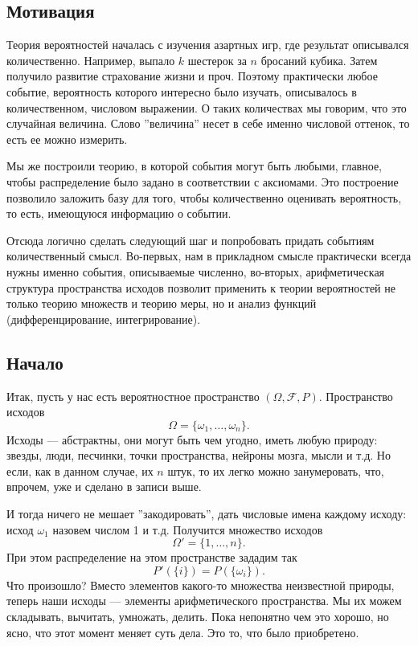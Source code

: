 \documentclass[a4paper,12pt]{article}
\newcounter{th-counter}
\begin{document}
\subsection*{Мотивация}
Теория вероятностей началась с изучения азартных игр, где результат описывался количественно. Например, выпало $k$ шестерок за $n$ бросаний кубика. Затем получило развитие страхование жизни и проч. Поэтому практически любое событие, вероятность которого интересно было изучать, описывалось в количественном, числовом выражении. О таких количествах мы говорим, что это случайная величина. Слово ''величина'' несет в себе именно числовой оттенок, то есть ее можно измерить.

Мы же построили теорию, в которой события могут быть любыми, главное, чтобы распределение было задано в соответствии с аксиомами. Это построение позволило заложить базу для того, чтобы количественно оценивать вероятность, то есть, имеющуюся информацию о событии.

Отсюда логично сделать следующий шаг и попробовать придать событиям количественный смысл. Во-первых, нам в прикладном смысле практически всегда нужны именно события, описываемые численно, во-вторых, арифметическая структура пространства исходов позволит применить к теории вероятностей не только теорию множеств и теорию меры, но и анализ функций (дифференцирование, интегрирование).

\subsection*{Начало}
Итак, пусть у нас есть вероятностное пространство $(\Omega, \mathcal{F}, P)$. Пространство исходов
\[
\Omega = \{\omega_1, \ldots, \omega_n\}.
\]
Исходы --- абстрактны, они могут быть чем угодно, иметь любую природу: звезды, люди, песчинки, точки пространства, нейроны мозга, мысли и т.д. Но если, как в данном случае, их $n$ штук, то их легко можно занумеровать, что, впрочем, уже и сделано в записи выше.

И тогда ничего не мешает ''закодировать'', дать числовые имена каждому исходу: исход $\omega_1$ назовем числом 1 и т.д. Получится множество исходов
\[
\Omega' = \{1, \ldots, n\}.
\]
При этом распределение на этом пространстве зададим так
\[
P'(\{i\}) = P(\{\omega_i\}).
\]
Что произошло? Вместо элементов какого-то множества неизвестной природы, теперь наши исходы --- элементы арифметического пространства. Мы их можем складывать, вычитать, умножать, делить. Пока непонятно чем это хорошо, но ясно, что этот момент меняет суть дела. Это то, что было приобретено.
\end{document}
